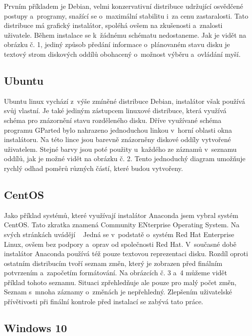 \documentclass[a4paper]{article}
\begin{document}
Prvním příkladem je Debian, velmi konzervativní distribuce udržující osvědčené postupy a~programy, snažící se o~maximální stabilitu i~za cenu zastaralosti. 
Tato distribuce má grafický instalátor, spoléhá ovšem na zkušenosti a~znalosti uživatele. Během instalace se k~žádnému schématu nedostaneme. Jak je vidět na obrázku č. 1, jediný způsob předání 
informace o~plánovaném stavu disku je textový strom diskových oddílů obohacený o~možnost výběru a~ovládání myší.

\subsection{Ubuntu}

Ubuntu linux vychází z~výše zmíněné distribuce Debian, instalátor však používá svůj vlastní. Je také jediným zástupcem linuxové distribuce, která využívá  schéma 
pro znázornění stavu rozděleného disku. Dříve využívané schéma programu GParted bylo nahrazeno jednoduchou linkou v~horní oblasti okna instalátoru. Na této lince jsou barevně znázorněny diskové 
oddíly vytvořené uživatelem. Stejné barvy jsou poté použity u~každého ze záznamů v~seznamu oddílů, jak je možné vidět na obrázku č. 2. Tento jednoduchý diagram umožňuje rychlý odhad poměrů různých 
částí, které budou vytvořeny.

\subsection{CentOS}

Jako příklad systémů, které využívají instalátor Anaconda jsem vybral systém CentOS. Tato zkratka znamená Community ENterprise Operating System. Na svých stránkách uvádějí 
~\cite{CentOS} 
Jedná se v~podstatě o~systém Red Hat Enterprise Linux, ovšem bez podpory a~oprav od společnosti Red Hat. V~současné době instalátor Anaconda používá též pouze textovou 
reprezentaci disku. Rozdíl oproti ostatním distribucím tvoří seznam změn, který je zobrazen před finálním potvrzením a~započetím formátování. Na obrázcích č. 3 a~4 můžeme
vidět příklad tohoto seznamu. Situaci zpřehledňuje ale pouze pro malý počet změn, Seznam s~mnoha 
záznamy o~změnách je nepřehledný. Zlepšením uživatelské přívětivosti při finální kontrole před instalací se zabývá tato práce.

\subsection{Windows 10}
\end{document}
